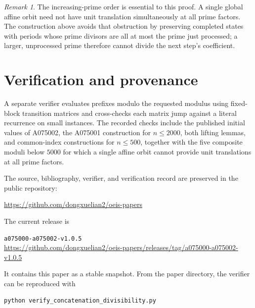 \documentclass[11pt]{amsart}
\theoremstyle{remark}
\newtheorem{remark}[theorem]{Remark}
\begin{document}
\begin{remark}\label{rem:increasing-primes}
The increasing-prime order is essential to this proof.  A single global affine orbit need not
have unit translation simultaneously at all prime factors.  The construction above avoids that
obstruction by preserving completed states with periods whose prime divisors are all at most the
prime just processed; a larger, unprocessed prime therefore cannot divide the next step's
coefficient.
\end{remark}

\section{Verification and provenance}
\label{sec:verification}

A separate verifier evaluates prefixes modulo the
requested modulus using fixed-block transition matrices and cross-checks each matrix jump
against a literal recurrence on small instances.  The recorded checks include the published
initial values of A075002, the A075001 construction for \(n\le2000\), both lifting lemmas, and
common-index constructions for \(n\le500\), together with the five composite moduli below
\(5000\) for which a single affine orbit cannot provide unit translations at all prime factors.

The source, bibliography, verifier, and verification record are preserved in
the public repository:
\begin{center}
\small\url{https://github.com/dongxuelian2/oeis-papers}
\end{center}
The current release is
\begin{center}
\texttt{a075000-a075002-v1.0.5}\\
\small\url{https://github.com/dongxuelian2/oeis-papers/releases/tag/a075000-a075002-v1.0.5}
\end{center}
It contains this paper as a stable snapshot.  From the paper directory, the verifier can be
reproduced with
\begin{verbatim}
python verify_concatenation_divisibility.py
\end{verbatim}



\end{document}
